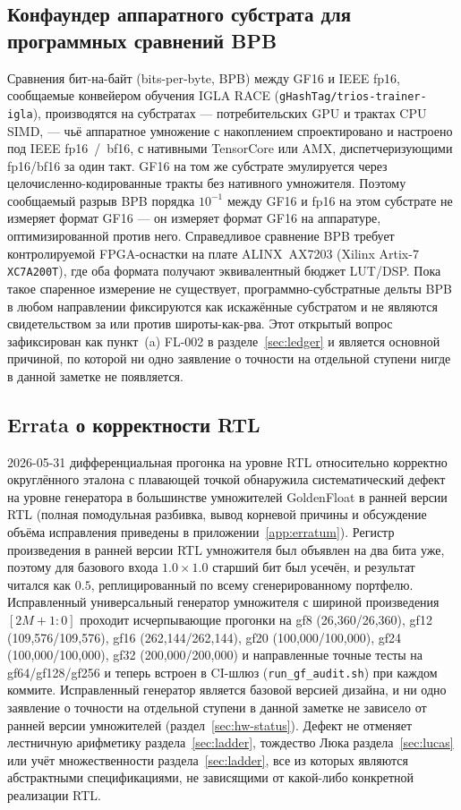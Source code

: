 \documentclass[11pt,a4paper]{article}
\theoremstyle{plain}
\begin{document}
\subsection{Конфаундер аппаратного субстрата для программных сравнений BPB}
\label{sec:hw-confound}

Сравнения бит-на-байт (bits-per-byte, BPB) между GF16 и IEEE fp16,
сообщаемые конвейером обучения IGLA RACE
(\texttt{gHashTag/trios-trainer-igla}), производятся на субстратах ---
потребительских GPU и трактах CPU SIMD, --- чьё аппаратное умножение с
накоплением спроектировано и настроено под IEEE fp16~/~bf16, с нативными
TensorCore или AMX, диспетчеризующими fp16/bf16 за один такт. GF16 на том же
субстрате эмулируется через целочисленно-кодированные тракты без нативного
умножителя. Поэтому сообщаемый разрыв BPB порядка \(10^{-1}\) между GF16 и
fp16 на этом субстрате не измеряет формат GF16 --- он измеряет формат GF16 на
аппаратуре, оптимизированной против него. Справедливое сравнение BPB требует
контролируемой FPGA-оснастки на плате ALINX~AX7203 (Xilinx Artix-7
\texttt{XC7A200T}),
где оба формата получают эквивалентный бюджет LUT/DSP. Пока такое спаренное
измерение не существует, программно-субстратные дельты BPB в любом направлении
фиксируются как искажённые субстратом и не являются свидетельством за или против
широты-как-рва. Этот открытый вопрос зафиксирован как пункт~(a) FL-002 в
разделе~\ref{sec:ledger} и является основной причиной, по которой ни одно
заявление о точности на отдельной ступени нигде в данной заметке не появляется.

\subsection{Errata о корректности RTL}\label{sec:hw-erratum}

2026-05-31 дифференциальная прогонка на уровне RTL относительно корректно
округлённого эталона с плавающей точкой обнаружила систематический дефект на
уровне генератора в большинстве умножителей GoldenFloat в ранней версии RTL
(полная помодульная разбивка, вывод
корневой причины и обсуждение объёма исправления приведены в
приложении~\ref{app:erratum}). Регистр произведения в ранней версии RTL
умножителя был объявлен на два бита уже, поэтому для базового входа
\(1.0 \times 1.0\) старший бит был усечён, и результат читался как \(0.5\),
реплицированный по всему сгенерированному портфелю. Исправленный универсальный
генератор умножителя с шириной произведения \([2M+1:0]\) проходит исчерпывающие
прогонки на gf8 (26{,}360/26{,}360), gf12 (109{,}576/109{,}576), gf16
(262{,}144/262{,}144), gf20 (100{,}000/100{,}000), gf24
(100{,}000/100{,}000), gf32 (200{,}000/200{,}000) и направленные точные тесты
на gf64/gf128/gf256 и теперь встроен в CI-шлюз
(\texttt{run\_gf\_audit.sh}) при каждом коммите. Исправленный генератор
является базовой версией дизайна, и ни одно заявление о точности на
отдельной ступени в данной заметке не зависело от ранней версии умножителей
(раздел~\ref{sec:hw-status}). Дефект не отменяет лестничную
арифметику раздела~\ref{sec:ladder}, тождество Люка раздела~\ref{sec:lucas} или
учёт множественности раздела~\ref{sec:ladder}, все из которых являются
абстрактными спецификациями, не зависящими от какой-либо конкретной реализации
RTL.
\end{document}
